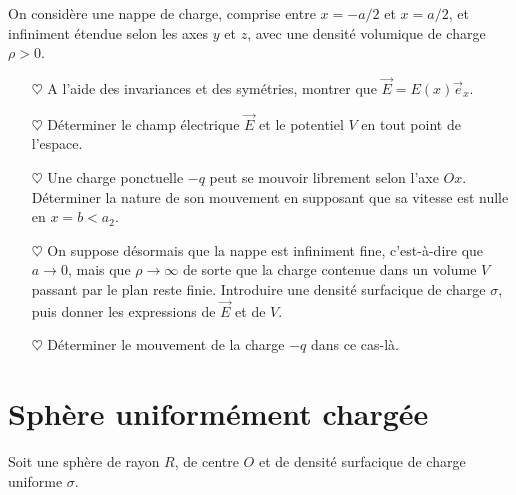\documentclass{report}
\begin{document}
On considère une nappe de charge, comprise entre $x=-a/2$ et $x=a/2$, et infiniment étendue selon les axes $y$ et $z$, avec une densité volumique de charge $\rho>0$.

\begin{itemize}

	\item[$\heartsuit$] A l'aide des invariances et des symétries, montrer que $\vec{E}=E(x)\vec{e}_x$.

	\item[$\heartsuit$] Déterminer le champ électrique $\vec{E}$ et le potentiel $V$ en tout point de l'espace.
	
	\item[$\heartsuit$] Une charge ponctuelle $-q$ peut se mouvoir librement selon l'axe $Ox$. Déterminer la nature de son mouvement en supposant que sa vitesse est nulle en $x=b<a_2$.
	
	\item[$\heartsuit$] On suppose désormais que la nappe est infiniment fine, c'est-à-dire que $a\longrightarrow0$, mais que $\rho\longrightarrow\infty$ de sorte que la charge contenue dans un volume $V$ passant par le plan reste finie. Introduire une densité surfacique de charge $\sigma$, puis donner les expressions de $\vec{E}$ et de $V$.
	
	\item[$\heartsuit$] Déterminer le mouvement de la charge $-q$ dans ce cas-là. 
	
\end{itemize}

\newpage

\section*{Sphère uniformément chargée}
Soit une sphère de rayon $R$, de centre $O$ et de densité surfacique de charge uniforme $\sigma$.
\end{document}
